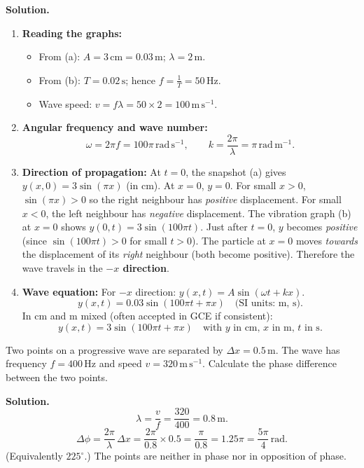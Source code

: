 \documentclass[11pt]{article}
\begin{document}
\begin{exoresolu}
\tcblower
\textbf{Solution.}
\begin{enumerate}
  \item \textbf{Reading the graphs:}
  \begin{itemize}
    \item From (a): $A = 3\,\mathrm{cm} = 0.03\,\mathrm{m}$; $\lambda = 2\,\mathrm{m}$.
    \item From (b): $T = 0.02\,\mathrm{s}$; hence $f = \frac{1}{T} = 50\,\mathrm{Hz}$.
    \item Wave speed: $v = f\lambda = 50 \times 2 = 100\,\mathrm{m\,s^{-1}}$.
  \end{itemize}
  \item \textbf{Angular frequency and wave number:}
  \[
  \omega = 2\pi f = 100\pi\,\mathrm{rad\,s^{-1}}, \qquad k = \frac{2\pi}{\lambda} = \pi\,\mathrm{rad\,m^{-1}}.
  \]
  \item \textbf{Direction of propagation:}
  At $t=0$, the snapshot (a) gives $y(x,0) = 3\sin(\pi x)$ (in cm). At $x=0$, $y=0$. For small $x>0$, $\sin(\pi x)>0$ so the right neighbour has \emph{positive} displacement. For small $x<0$, the left neighbour has \emph{negative} displacement.
  The vibration graph (b) at $x=0$ shows $y(0,t) = 3\sin(100\pi t)$. Just after $t=0$, $y$ becomes \emph{positive} (since $\sin(100\pi t) > 0$ for small $t>0$).
  The particle at $x=0$ moves \emph{towards} the displacement of its \emph{right} neighbour (both become positive). Therefore the wave travels in the \textbf{$-x$ direction}.
  \item \textbf{Wave equation:}
  For $-x$ direction: $y(x,t) = A \sin(\omega t + k x)$.
  \[
  y(x,t) = 0.03 \sin(100\pi t + \pi x) \quad \text{(SI units: m, s)}.
  \]
  In cm and m mixed (often accepted in GCE if consistent):
  \[
  y(x,t) = 3 \sin(100\pi t + \pi x) \quad \text{with $y$ in cm, $x$ in m, $t$ in s}.
  \]
\end{enumerate}
\end{exoresolu}

\begin{exoresolu}
Two points on a progressive wave are separated by $\Delta x = 0.5\,\mathrm{m}$. The wave has frequency $f = 400\,\mathrm{Hz}$ and speed $v = 320\,\mathrm{m\,s^{-1}}$. Calculate the phase difference between the two points.

\tcblower
\textbf{Solution.}
\[
\lambda = \frac{v}{f} = \frac{320}{400} = 0.8\,\mathrm{m}.
\]
\[
\Delta \phi = \frac{2\pi}{\lambda}\,\Delta x = \frac{2\pi}{0.8} \times 0.5 = \frac{\pi}{0.8} = 1.25\pi = \frac{5\pi}{4}\,\mathrm{rad}.
\]
(Equivalently $225^\circ$.) The points are neither in phase nor in opposition of phase.
\end{exoresolu}
\end{document}
